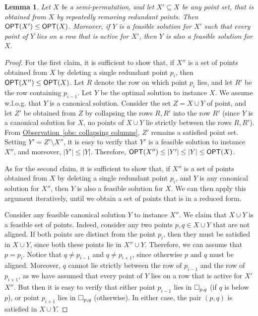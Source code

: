 \documentclass[11pt]{article}
\numberwithin{equation}{section}
\newtheorem{lemma}[theorem]{Lemma}
\theoremstyle{definition}
\theoremstyle{plain}
\newcommand{\expref}[2]{\hyperref[#2]{#1~\ref{#2}}}
\begin{document}
\begin{lemma}\label{lem: reduced point set} 
	Let $X$ be a semi-permutation, and let $X' \subseteq X$ be any point set, that is obtained from $X$ by repeatedly removing redundant points.  Then $\mbox{\sf OPT}(X')\leq \mbox{\sf OPT}(X)$. Moreover, if $Y$ is a feasible solution for $X'$ such that every point of $Y$ lies on a row that is active for $X'$, then $Y$ is also a feasible solution for $X$.
\end{lemma}
\begin{proof}
For the first claim, it is sufficient to show that, if $X''$ is a set of points obtained from $X$ by deleting a single redundant point $p_i$, then $\mbox{\sf OPT}(X'')\leq \mbox{\sf OPT}(X)$. Let $R$ denote the row on which point $p_i$ lies, and let $R'$ be the row containing $p_{i-1}$. Let $Y$ be the optimal solution to instance $X$. We assume w.l.o.g. that $Y$ is a canonical solution. Consider the set $Z=X\cup Y$ of point, and let $Z'$ be obtained from $Z$ by collapsing the rows $R,R'$ into the row $R'$ (since $Y$ is a canonical solution for $X$, no points of $X\cup Y$ lie strictly between the rows $R,R'$). From \expref{Observation}{obs: collapsing columns}, $Z'$ remains a satisfied point set. Setting $Y'=Z'\setminus X''$, it is easy to verify that $Y'$ is a feasible solution to instance $X''$, and moreover, $|Y'|\leq |Y|$. Therefore, $\mbox{\sf OPT}(X'')\leq |Y'|\leq |Y|\leq \mbox{\sf OPT}(X)$.


As for the second claim, it is sufficient to show that, if $X''$ is a set of points obtained from $X$ by deleting a single redundant point $p_i$, and $Y$ is any canonical solution for $X''$, then $Y$ is also a feasible solution for $X$. We can then apply this argument iteratively, until we obtain a set of points that is in a reduced form.
	
	Consider any feasible canonical solution $Y$ to instance $X''$. We claim that $X \cup Y$ is a feasible set of points. Indeed,
	consider any two points $p,q \in X \cup Y$ that are not aligned. If both points are distinct from the point $p_i$, then they must be satisfied in $X\cup Y$, since both these points lie in $X''\cup Y$. Therefore, we can assume that $p=p_i$. Notice that $q \neq p_{i-1}$ and  $q \neq p_{i+1}$, since otherwise $p$ and $q$ must be aligned. Moreover, $q$ cannot lie strictly between the row of $p_{i-1}$ and the row of $p_{i+1}$, as we have assumed that every point of $Y$ lies on a row that is active for $X'$ $X''$. But then it is easy to verify that either point $p_{i-1}$ lies in $\Box_{p,q}$ (if $q$ is below $p$), or point $p_{i+1}$ lies in $\Box_{p,q}$ (otherwise). In either case, the pair $(p,q)$ is satisfied in $X\cup Y$.    
\end{proof}
\end{document}
